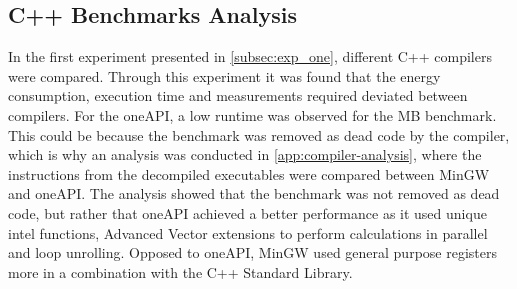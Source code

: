 \subsection{C++ Benchmarks Analysis}

In the first experiment presented in \cref{subsec:exp_one}, different C++ compilers were compared. Through this experiment it was found that the energy consumption, execution time and measurements required deviated between compilers. For the oneAPI, a low runtime was observed for the MB benchmark. This could be because the benchmark was removed as dead code by the compiler, which is why an analysis was conducted in \cref{app:compiler-analysis}, where the instructions from the decompiled executables were compared between MinGW and oneAPI. The analysis showed that the benchmark was not removed as dead code, but rather that oneAPI achieved a better performance as it used unique intel functions, Advanced Vector extensions to perform calculations in parallel and loop unrolling. Opposed to oneAPI, MinGW used general purpose registers more in a combination with the C++ Standard Library.  







